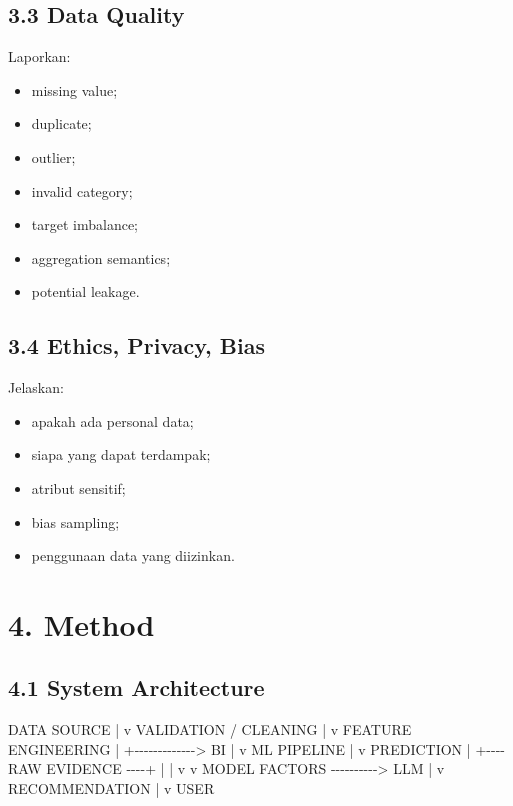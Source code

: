 \documentclass[
  indonesian,
  letterpaper,
  DIV=11,
  numbers=noendperiod]{scrreprt}
\newenvironment{Shaded}{\begin{snugshade}}{\end{snugshade}}
\newcommand{\NormalTok}[1]{\textcolor[rgb]{0.00,0.23,0.31}{#1}}
\providecommand{\tightlist}{%
  \setlength{\itemsep}{0pt}\setlength{\parskip}{0pt}}
\begin{document}
\section{3.3 Data Quality}\label{data-quality}

Laporkan:

\begin{itemize}
\tightlist
\item
  missing value;
\item
  duplicate;
\item
  outlier;
\item
  invalid category;
\item
  target imbalance;
\item
  aggregation semantics;
\item
  potential leakage.
\end{itemize}

\section{3.4 Ethics, Privacy, Bias}\label{ethics-privacy-bias}

Jelaskan:

\begin{itemize}
\tightlist
\item
  apakah ada personal data;
\item
  siapa yang dapat terdampak;
\item
  atribut sensitif;
\item
  bias sampling;
\item
  penggunaan data yang diizinkan.
\end{itemize}

\chapter{4. Method}\label{method}

\section{4.1 System Architecture}\label{system-architecture}

\begin{Shaded}
\begin{Highlighting}[]
\NormalTok{DATA SOURCE}
\NormalTok{    |}
\NormalTok{    v}
\NormalTok{VALIDATION / CLEANING}
\NormalTok{    |}
\NormalTok{    v}
\NormalTok{FEATURE ENGINEERING}
\NormalTok{    |}
\NormalTok{    +{-}{-}{-}{-}{-}{-}{-}{-}{-}{-}{-}{-}{-}\textgreater{} BI}
\NormalTok{    |}
\NormalTok{    v}
\NormalTok{ML PIPELINE}
\NormalTok{    |}
\NormalTok{    v}
\NormalTok{PREDICTION}
\NormalTok{    |}
\NormalTok{    +{-}{-}{-}{-} RAW EVIDENCE {-}{-}{-}{-}+}
\NormalTok{    |                      |}
\NormalTok{    v                      v}
\NormalTok{MODEL FACTORS {-}{-}{-}{-}{-}{-}{-}{-}{-}{-}\textgreater{} LLM}
\NormalTok{                           |}
\NormalTok{                           v}
\NormalTok{                    RECOMMENDATION}
\NormalTok{                           |}
\NormalTok{                           v}
\NormalTok{                         USER}
\end{Highlighting}
\end{Shaded}
\end{document}
